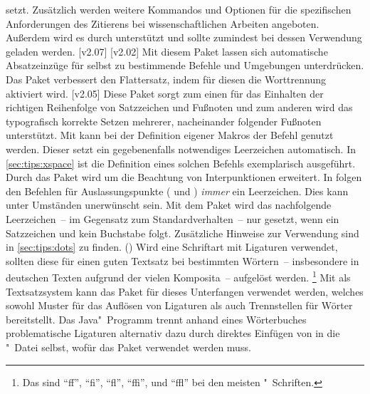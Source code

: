 \begin{DeclarePackages}
  setzt. Zusätzlich werden weitere Kommandos und Optionen für die spezifischen 
  Anforderungen des Zitierens bei wissenschaftlichen Arbeiten angeboten. 
  Außerdem wird es durch  unterstützt und sollte zumindest 
  bei dessen Verwendung geladen werden.
  [v2.07]
[v2.02]
  Mit diesem Paket lassen sich automatische Absatzeinzüge für selbst zu 
  bestimmende Befehle und Umgebungen unterdrücken.
  Das Paket verbessert den Flattersatz, indem für diesen die Worttrennung 
  aktiviert wird.
[v2.05]
  Diese Paket sorgt zum einen für das Einhalten der richtigen Reihenfolge von 
  Satzzeichen und Fußnoten und zum anderen wird das typografisch korrekte 
  Setzen mehrerer, nacheinander folgender Fußnoten unterstützt. 
  Mit  kann bei der Definition eigener Makros der Befehl 
   genutzt werden. Dieser setzt ein gegebenenfalls notwendiges 
  Leerzeichen automatisch. In \autoref{sec:tips:xspace} ist die Definition 
  eines solchen Befehls exemplarisch ausgeführt. Durch das Paket 
   wird  um die Beachtung von 
  Interpunktionen erweitert.
  In  folgen den Befehlen für Auslassungspunkte ( und 
  ) \emph{immer} ein Leerzeichen. Dies kann unter Umständen 
  unerwünscht sein. Mit dem Paket  wird das nachfolgende 
  Leerzeichen~-- im Gegensatz zum Standardverhalten~-- nur gesetzt, wenn ein 
  Satzzeichen und kein Buchstabe folgt. Zusätzliche Hinweise zur Verwendung 
  sind in \autoref{sec:tips:dots} zu finden.
()
  Wird eine Schriftart mit Ligaturen verwendet, sollten diese für einen guten 
  Textsatz bei bestimmten Wörtern~-- insbesondere in deutschen Texten aufgrund 
  der vielen Komposita~-- aufgelöst werden.%
  \footnote{%
    Das sind \enquote{ff}, \enquote{fi}, \enquote{fl}, \enquote{ffi}, und 
    \enquote{ffl} bei den meisten "~Schriften.%
  }
  Mit  als Textsatzsystem kann das Paket  
  für dieses Unterfangen verwendet werden, welches sowohl Muster für das 
  Auflösen von Ligaturen als auch Trennstellen für Wörter bereitstellt. 
  Das Java"~Programm  trennt anhand eines Wörterbuches 
  problematische Ligaturen alternativ dazu durch direktes Einfügen von 
   in die "~Datei selbst, wofür das Paket 
   verwendet werden muss.
\end{DeclarePackages}
%



